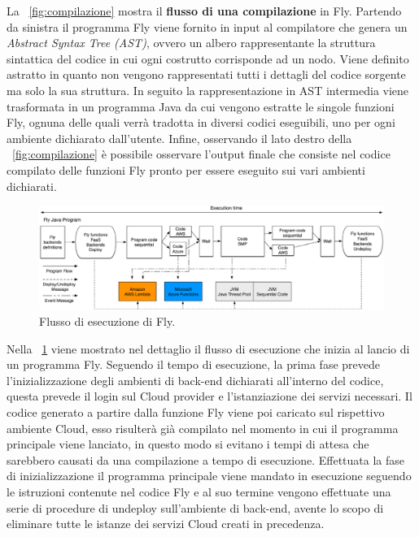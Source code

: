 La \figurename~\ref{fig:compilazione} mostra il \textbf{flusso di una compilazione} in Fly. Partendo da sinistra il programma Fly viene fornito in input al compilatore che genera un \textit{Abstract Syntax Tree (AST)}, ovvero un albero rappresentante la struttura sintattica del codice in cui ogni costrutto corrisponde ad un nodo. Viene definito astratto in quanto non vengono rappresentati tutti i dettagli del codice sorgente ma solo la sua struttura. In seguito la rappresentazione in AST intermedia viene trasformata in un programma Java da cui vengono estratte le singole funzioni Fly, ognuna delle quali verrà tradotta in diversi codici eseguibili, uno per ogni ambiente dichiarato dall’utente. Infine, osservando il lato destro della \figurename~\ref{fig:compilazione} è possibile osservare l’output finale che consiste nel codice compilato delle funzioni Fly pronto per essere eseguito sui vari ambienti dichiarati.

\begin{figure}[htbp]
 \centering
 \includegraphics[scale=0.22]{./Figure/FLYEsecuzione.png}
 \caption{Flusso di esecuzione di Fly.}
 \label{fig:esecuzione}
\end{figure}

Nella \figurename~\ref{fig:esecuzione} viene mostrato nel dettaglio il flusso di esecuzione che inizia al lancio di un programma Fly. Seguendo il tempo di esecuzione, la prima fase prevede l’inizializzazione degli ambienti di back-end dichiarati all’interno del codice, questa prevede il login sul Cloud provider e l’istanziazione dei servizi necessari. Il codice generato a partire dalla funzione Fly viene poi caricato sul rispettivo ambiente Cloud, esso risulterà già compilato nel momento in cui il programma principale viene lanciato, in questo modo si evitano i tempi di attesa che sarebbero causati da una compilazione a tempo di esecuzione. Effettuata la fase di inizializzazione il programma principale viene mandato in esecuzione seguendo le istruzioni contenute nel codice Fly e al suo termine vengono effettuate una serie di procedure di undeploy sull’ambiente di back-end, avente lo scopo di eliminare tutte le istanze dei servizi Cloud creati in precedenza.

